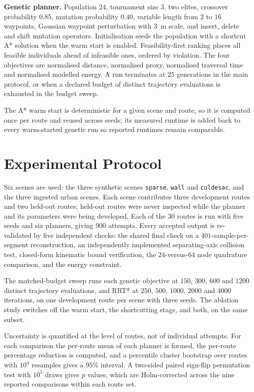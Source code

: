 \documentclass[conference]{IEEEtran}
\begin{document}
\textbf{Genetic planner.} Population $24$, tournament size $3$, two elites,
crossover probability $0.85$, mutation probability $0.40$, variable length from
$2$ to $16$ waypoints, Gaussian waypoint perturbation with $3$~m scale, and
insert, delete and shift mutation operators. Initialisation seeds the population
with a shortcut A* solution when the warm start is enabled. Feasibility-first
ranking places all feasible individuals ahead of infeasible ones, ordered by
violation. The four objectives are normalised distance, normalised proxy,
normalised traversal time and normalised modelled energy. A run terminates at
$25$ generations in the main protocol, or when a declared budget of distinct
trajectory evaluations is exhausted in the budget sweep.

The A* warm start is deterministic for a given scene and route, so it is
computed once per route and reused across seeds; its measured runtime is added
back to every warm-started genetic run so reported runtimes remain comparable.

\section{Experimental Protocol}
Six scenes are used: the three synthetic scenes \texttt{sparse},
\texttt{wall} and \texttt{culdesac}, and the three ingested urban scenes. Each
scene contributes three development routes and two held-out routes; held-out
routes were never inspected while the planner and its parameters were being
developed. Each of the $30$ routes is run with five seeds and six planners,
giving $900$ attempts. Every accepted output is re-validated by five independent
checks: the shared final check on a $401$-sample-per-segment reconstruction, an
independently implemented separating-axis collision test, closed-form kinematic
bound verification, the $24$-versus-$64$ node quadrature comparison, and the
energy constraint.

The matched-budget sweep runs each genetic objective at $150$, $300$, $600$ and
$1200$ distinct trajectory evaluations, and RRT* at $250$, $500$, $1000$, $2000$
and $4000$ iterations, on one development route per scene with three seeds. The
ablation study switches off the warm start, the shortcutting stage, and both,
on the same subset.

Uncertainty is quantified at the level of routes, not of individual attempts.
For each comparison the per-route mean of each planner is formed, the per-route
percentage reduction is computed, and a percentile cluster bootstrap over routes
with $10^4$ resamples gives a $95\%$ interval. A two-sided paired sign-flip
permutation test with $10^5$ draws gives $p$ values, which are Holm-corrected
across the nine reported comparisons within each route set.
\end{document}
